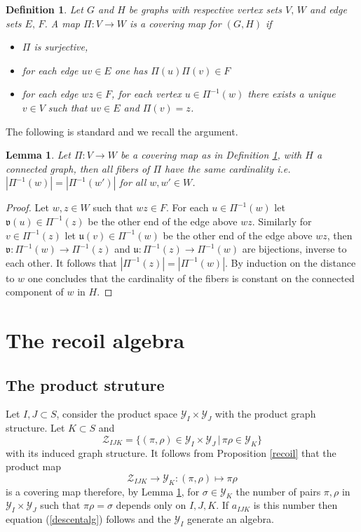\documentclass[11pt,a4paper]{amsart}
\newtheorem{lemma}[theorem]{Lemma}
\newtheorem{definition}[theorem]{Definition}
\theoremstyle{contraction}
\begin{document}
\begin{definition}\label{covering} Let $G$ and $H$ be graphs with respective vertex sets $V,\,W$ and edge sets 
$E,\,F$. A map $\Pi: V\to W$ is a {\sl covering map} for $(G,H)$  if 
\begin{itemize}
\item
$\Pi$ is surjective, 
\item for  each edge $uv\in E$ one has  $\Pi(u)\Pi(v)\in F$
\item  for each edge  $wz\in F$, for each vertex $u\in \Pi^{-1}(w)$   there exists a unique  $v\in V$
  such that 
$uv\in E$  and  $\Pi(v)=z$.
\end{itemize}
\end{definition}
The following is standard and we recall the argument.
\begin{lemma}\label{cover}
Let $\Pi:V\to W$ be a covering map as in Definition \ref{covering}, with $H$ a connected graph, then all fibers of $\Pi$ have the same cardinality 
i.e. $|\Pi^{-1}(w)|=|\Pi^{-1}(w')|$ for all $w,w'\in W$.
\end{lemma}
\begin{proof} 
Let $w,z\in W$  such that  $wz\in F$. For each $u\in \Pi^{-1}(w)$ let ${\mathfrak v}(u)\in\Pi^{-1}(z)$ be the other end  of the edge above $wz$. Similarly for $v\in \Pi^{-1}(z)$ let ${\mathfrak u}(v)\in\Pi^{-1}(w)$ be the other end  of the edge above $wz$, then ${\mathfrak v}:\Pi^{-1}(w)\to\Pi^{-1}(z)$ and 
${\mathfrak u}:\Pi^{-1}(z)\to\Pi^{-1}(w)$ are bijections, inverse to each other. 
It follows that $|\Pi^{-1}(z)|=|\Pi^{-1}(w)|$.  By induction on the distance to $w$ one concludes that the cardinality of the fibers is constant on the connected component of $w$ in $H$.

\end{proof}
\section{The recoil algebra}
\subsection{The product struture}
Let $I,J\subset S$, consider the product space ${\mathcal Y}_I\times {\mathcal Y}_J$ with the product graph structure. 
Let $K\subset S$ and 
\begin{equation}\label{Z}
{\mathcal Z}_{IJK}=\{(\pi,\rho)\in{\mathcal Y}_I\times {\mathcal Y}_J\,|\,\pi\rho\in {\mathcal Y}_K\}
\end{equation}
 with its induced graph structure. It follows from  Proposition \ref{recoil}  that the product map 
\begin{equation}\label{ZY}{\mathcal Z}_{IJK}\to {\mathcal Y}_K:(\pi,\rho)\mapsto \pi\rho
\end{equation} 
is a covering map therefore, by 
Lemma \ref{cover}, for $\sigma\in{\mathcal Y}_K$  the number of pairs $\pi,\rho$ in  ${\mathcal Y}_I\times {\mathcal Y}_J$ such that $\pi\rho=\sigma$
depends only on $I,J,K$. If $a_{IJK}$ is this number then equation (\ref{descentalg}) follows and the
${\mathcal Y}_I$ generate an algebra.
\end{document}
